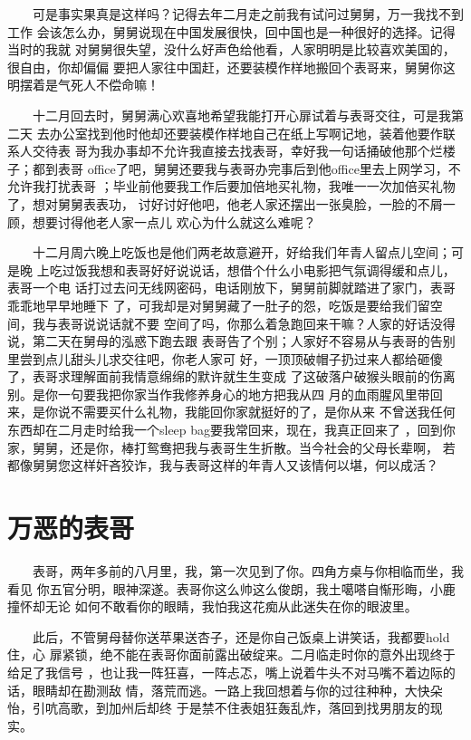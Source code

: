 \documentclass[12pt]{book}
\begin{document}
　　可是事实果真是这样吗？记得去年二月走之前我有试问过舅舅，万一我找不到工作
会该怎么办，舅舅说现在中国发展很快，回中国也是一种很好的选择。记得当时的我就
对舅舅很失望，没什么好声色给他看，人家明明是比较喜欢美国的，很自由，你却偏偏
要把人家往中国赶，还要装模作样地搬回个表哥来，舅舅你这明摆着是气死人不偿命嘛！

　　十二月回去时，舅舅满心欢喜地希望我能打开心扉试着与表哥交往，可是我第二天
去办公室找到他时他却还要装模作样地自己在纸上写啊记地，装着他要作联系人交待表
哥为我办事却不允许我直接去找表哥，幸好我一句话捅破他那个烂楼子；都到表哥
office了吧，舅舅还要我与表哥办完事后到他office里去上网学习，不允许我打扰表哥
；毕业前他要我工作后要加倍地买礼物，我唯一一次加倍买礼物了，想对舅舅表表功，
讨好讨好他吧，他老人家还摆出一张臭脸，一脸的不屑一顾，想要讨得他老人家一点儿
欢心为什么就这么难呢？

　　十二月周六晚上吃饭也是他们两老故意避开，好给我们年青人留点儿空间；可是晚
上吃过饭我想和表哥好好说说话，想借个什么小电影把气氛调得缓和点儿，表哥一个电
话打过去问无线网密码，电话刚放下，舅舅前脚就踏进了家门，表哥乖乖地早早地睡下
了，可我却是对舅舅藏了一肚子的怨，吃饭是要给我们留空间，我与表哥说说话就不要
空间了吗，你那么着急跑回来干嘛？人家的好话没得说，第二天在舅母的泓惑下跑去跟
表哥告了个别；人家好不容易从与表哥的告别里尝到点儿甜头儿求交往吧，你老人家可
好，一顶顶破帽子扔过来人都给砸傻了，表哥求理解面前我情意绵绵的默许就生生变成
了这破落户破猴头眼前的伤离别。是你一句要我把你家当作我修养身心的地方把我从四
月的血雨腥风里带回来，是你说不需要买什么礼物，我能回你家就挺好的了，是你从来
不曾送我任何东西却在二月走时给我一个sleep bag要我常回来，现在，我真正回来了
，回到你家，舅舅，还是你，棒打鸳鸯把我与表哥生生折散。当今社会的父母长辈啊，
若都像舅舅您这样奸吝狡诈，我与表哥这样的年青人又该情何以堪，何以成活？
\section{万恶的表哥}
\label{sec-8-21}

　　表哥，两年多前的八月里，我，第一次见到了你。四角方桌与你相临而坐，我看见
你五官分明，眼神深遂。表哥你这么帅这么俊朗，我土噶嗒自惭形晦，小鹿撞怀却无论
如何不敢看你的眼睛，我怕我这花痴从此迷失在你的眼波里。

　　此后，不管舅母替你送苹果送杏子，还是你自己饭桌上讲笑话，我都要hold住，心
扉紧锁，绝不能在表哥你面前露出破绽来。二月临走时你的意外出现终于给足了我信号
，也让我一阵狂喜，一阵忐忑，嘴上说着牛头不对马嘴不着边际的话，眼睛却在勘测敌
情，落荒而逃。一路上我回想着与你的过往种种，大快朵怡，引吭高歌，到加州后却终
于是禁不住表姐狂轰乱炸，落回到找男朋友的现实。
\end{document}
